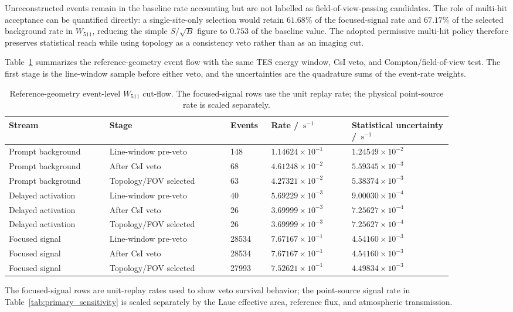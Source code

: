 \documentclass[11pt]{article}
\newcommand{\cps}{\ensuremath{\,\mathrm{s^{-1}}}}
\newcommand{\wii}{W_{511}}
\begin{document}
Unreconstructed events remain in the baseline rate accounting but are not
labelled as field-of-view-passing candidates. The role of multi-hit acceptance
can be quantified directly: a single-site-only selection would retain
$61.68\%$ of the focused-signal rate and $67.17\%$ of the selected background
rate in $\wii$, reducing the simple $S/\sqrt{B}$ figure to $0.753$ of the
baseline value. The adopted permissive multi-hit policy therefore preserves
statistical reach while using topology as a consistency veto rather than as an
imaging cut.

Table~\ref{tab:phase2_cutflow} summarizes the reference-geometry event flow with
the same TES energy window, CsI veto, and Compton/field-of-view test. The first
stage is the line-window sample before either veto, and the uncertainties are the
quadrature sums of the event-rate weights.

\begin{table}[t]
\centering
\caption{Reference-geometry event-level $\wii$ cut-flow. The focused-signal rows use the unit replay rate; the physical point-source rate is scaled separately.}
\label{tab:phase2_cutflow}
\footnotesize
{
\setlength{\tabcolsep}{3pt}
\begin{tabular}{p{0.20\linewidth}p{0.24\linewidth}p{0.08\linewidth}p{0.16\linewidth}p{0.20\linewidth}}
\toprule
Stream & Stage & Events & Rate / $\cps$ & Statistical uncertainty / $\cps$ \\
\midrule
Prompt background & Line-window pre-veto & 148 & $1.14624\times10^{-1}$ & $1.24549\times10^{-2}$ \\
Prompt background & After CsI veto & 68 & $4.61248\times10^{-2}$ & $5.59345\times10^{-3}$ \\
Prompt background & Topology/FOV selected & 63 & $4.27321\times10^{-2}$ & $5.38374\times10^{-3}$ \\
Delayed activation & Line-window pre-veto & 40 & $5.69229\times10^{-3}$ & $9.00030\times10^{-4}$ \\
Delayed activation & After CsI veto & 26 & $3.69999\times10^{-3}$ & $7.25627\times10^{-4}$ \\
Delayed activation & Topology/FOV selected & 26 & $3.69999\times10^{-3}$ & $7.25627\times10^{-4}$ \\
Focused signal & Line-window pre-veto & 28534 & $7.67167\times10^{-1}$ & $4.54160\times10^{-3}$ \\
Focused signal & After CsI veto & 28534 & $7.67167\times10^{-1}$ & $4.54160\times10^{-3}$ \\
Focused signal & Topology/FOV selected & 27993 & $7.52621\times10^{-1}$ & $4.49834\times10^{-3}$ \\
\bottomrule
\end{tabular}
\par}
\vspace{0.5ex}
\begin{minipage}{0.94\linewidth}
\footnotesize
The focused-signal rows are unit-replay rates used to show veto survival
behavior; the point-source signal rate in Table~\ref{tab:primary_sensitivity}
is scaled separately by the Laue effective area, reference flux, and atmospheric
transmission.
\end{minipage}
\end{table}
\end{document}

